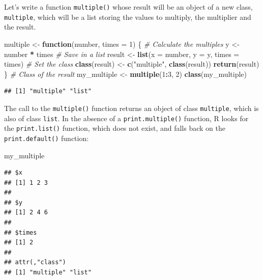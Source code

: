 \documentclass[
  12pt,
  american,
  a4paper,
  extrafontsizes,onecolumn,openright
  ]{memoir}
\newenvironment{Shaded}{\begin{snugshade}}{\end{snugshade}}
\newcommand{\AttributeTok}[1]{\textcolor[rgb]{0.13,0.29,0.53}{#1}}
\newcommand{\CommentTok}[1]{\textcolor[rgb]{0.56,0.35,0.01}{\textit{#1}}}
\newcommand{\ControlFlowTok}[1]{\textcolor[rgb]{0.13,0.29,0.53}{\textbf{#1}}}
\newcommand{\DecValTok}[1]{\textcolor[rgb]{0.00,0.00,0.81}{#1}}
\newcommand{\FunctionTok}[1]{\textcolor[rgb]{0.13,0.29,0.53}{\textbf{#1}}}
\newcommand{\NormalTok}[1]{#1}
\newcommand{\OtherTok}[1]{\textcolor[rgb]{0.56,0.35,0.01}{#1}}
\newcommand{\SpecialCharTok}[1]{\textcolor[rgb]{0.81,0.36,0.00}{\textbf{#1}}}
\newcommand{\StringTok}[1]{\textcolor[rgb]{0.31,0.60,0.02}{#1}}
\begin{document}
Let's write a function \texttt{multiple()} whose result will be an object of a new class, \texttt{multiple}, which will be a list storing the values to multiply, the multiplier and the result.

\scriptsize

\begin{Shaded}
\begin{Highlighting}[]
\NormalTok{multiple }\OtherTok{\textless{}{-}} \ControlFlowTok{function}\NormalTok{(number, }\AttributeTok{times =} \DecValTok{1}\NormalTok{) \{}
    \CommentTok{\# Calculate the multiples}
\NormalTok{    y }\OtherTok{\textless{}{-}}\NormalTok{ number }\SpecialCharTok{*}\NormalTok{ times}
    \CommentTok{\# Save in a list}
\NormalTok{    result }\OtherTok{\textless{}{-}} \FunctionTok{list}\NormalTok{(}\AttributeTok{x =}\NormalTok{ number, }\AttributeTok{y =}\NormalTok{ y, }\AttributeTok{times =}\NormalTok{ times)}
    \CommentTok{\# Set the class}
    \FunctionTok{class}\NormalTok{(result) }\OtherTok{\textless{}{-}} \FunctionTok{c}\NormalTok{(}\StringTok{"multiple"}\NormalTok{, }\FunctionTok{class}\NormalTok{(result))}
    \FunctionTok{return}\NormalTok{(result)}
\NormalTok{\}}
\CommentTok{\# Class of the result}
\NormalTok{my\_multiple }\OtherTok{\textless{}{-}} \FunctionTok{multiple}\NormalTok{(}\DecValTok{1}\SpecialCharTok{:}\DecValTok{3}\NormalTok{, }\DecValTok{2}\NormalTok{)}
\FunctionTok{class}\NormalTok{(my\_multiple)}
\end{Highlighting}
\end{Shaded}

\begin{verbatim}
## [1] "multiple" "list"
\end{verbatim}

\normalsize

The call to the \texttt{multiple()} function returns an object of class \texttt{multiple}, which is also of class \texttt{list}.
In the absence of a \texttt{print.multiple()} function, R looks for the \texttt{print.list()} function, which does not exist, and falls back on the \texttt{print.default()} function:

\scriptsize

\begin{Shaded}
\begin{Highlighting}[]
\NormalTok{my\_multiple}
\end{Highlighting}
\end{Shaded}

\begin{verbatim}
## $x
## [1] 1 2 3
## 
## $y
## [1] 2 4 6
## 
## $times
## [1] 2
## 
## attr(,"class")
## [1] "multiple" "list"
\end{verbatim}
\end{document}
